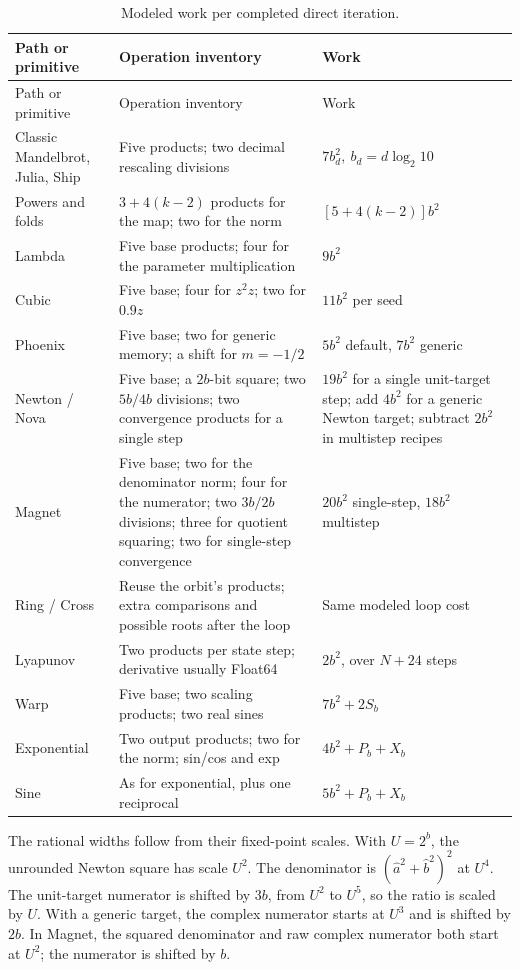 \documentclass[11pt,a4paper]{article}
\numberwithin{equation}{section}
\newlength{\TW}
\newcommand{\tableformat}[1]{\small\setlength{\tabcolsep}{4pt}%
  \renewcommand{\arraystretch}{1.20}\setlength{\TW}{\dimexpr\textwidth-#1pt\relax}}
\begin{document}
\begingroup\tableformat{16}
\begin{longtable}{@{}L{.24\TW}L{.44\TW}L{.32\TW}@{}}
\caption{Modeled work per completed direct iteration.}\label{tab:work}\\
\toprule Path or primitive & Operation inventory & Work\\
\midrule\endfirsthead
\toprule Path or primitive & Operation inventory & Work\\\midrule\endhead
\bottomrule\endlastfoot
Classic Mandelbrot, Julia, Ship & Five products; two decimal rescaling divisions
  & \(7b_d^2,\ b_d=d\log_2 10\)\\
Powers and folds & \(3+4(k-2)\) products for the map; two for the norm
  & \([5+4(k-2)]b^2\)\\
Lambda & Five base products; four for the parameter multiplication & \(9b^2\)\\
Cubic & Five base; four for \(z^2z\); two for \(0.9z\)
  & \(11b^2\) per seed\\
Phoenix & Five base; two for generic memory; a shift for \(m=-1/2\)
  & \(5b^2\) default, \(7b^2\) generic\\
Newton / Nova & Five base; a \(2b\)-bit square; two \(5b/4b\) divisions;
  two convergence products for a single step
  & \(19b^2\) for a single unit-target step; add \(4b^2\) for a
    generic Newton target; subtract \(2b^2\) in multistep recipes\\
Magnet & Five base; two for the denominator norm; four for the
  numerator; two \(3b/2b\) divisions; three for quotient squaring;
  two for single-step convergence
  & \(20b^2\) single-step, \(18b^2\) multistep\\
Ring / Cross & Reuse the orbit's products; extra comparisons and
  possible roots after the loop & Same modeled loop cost\\
Lyapunov & Two products per state step; derivative usually Float64
  & \(2b^2\), over \(N+24\) steps\\
Warp & Five base; two scaling products; two real sines & \(7b^2+2S_b\)\\
Exponential & Two output products; two for the norm; sin/cos and exp
  & \(4b^2+P_b+X_b\)\\
Sine & As for exponential, plus one reciprocal & \(5b^2+P_b+X_b\)\\
\end{longtable}
\endgroup

The rational widths follow from their fixed-point scales. With
\(U=2^b\), the unrounded Newton square has scale \(U^2\).
The denominator is \((\widehat a^2+\widehat b^2)^2\) at \(U^4\).
The unit-target numerator is shifted by \(3b\), from \(U^2\) to
\(U^5\), so the ratio is scaled by \(U\). With a generic target,
the complex numerator starts at \(U^3\) and is shifted by \(2b\).
In Magnet, the squared denominator and raw complex numerator both
start at \(U^2\); the numerator is shifted by \(b\).
\end{document}
